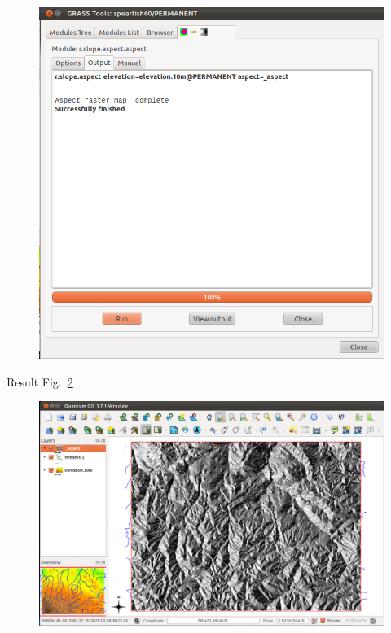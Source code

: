 \begin{figure}[htbp]
   \centering
   \includegraphics[scale=0.25]{qgis043.png}
   \caption{}
   \label{fig:qgis043}
\end{figure}

Result Fig.~\ref{fig:qgis044}

\begin{figure}[htbp]
   \centering
   \includegraphics[scale=0.2]{qgis044.png}
   \caption{}
   \label{fig:qgis044}
\end{figure}

\address{GRASS Development Team\\
  \url{http://grass.osgeo.org}\\
  }


